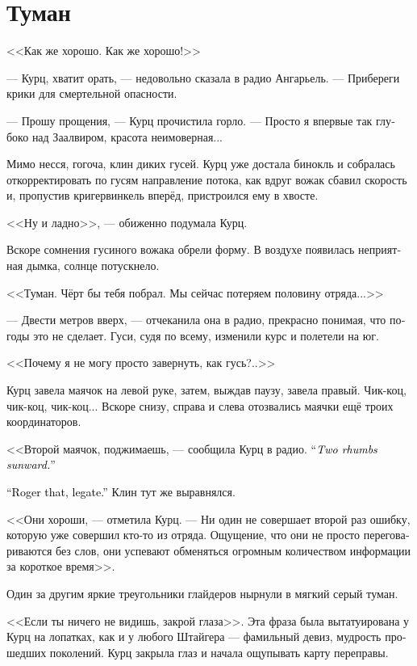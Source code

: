 \documentclass[a4paper,12pt,fleqn]{book}\usepackage{cooltooltips}\usepackage{polyglossia}\setdefaultlanguage[babelshorthands=true]{russian}\setotherlanguage{english}\defaultfontfeatures{Ligatures=TeX,Mapping=tex-text} \usepackage{xcolor}\definecolor{lightgray}{HTML}{bbbbbb}\color{lightgray}\newcommand{\ml}[3]{\textenglish{\textcolor{black}{#3}}}
\begin{document}
\section{Туман}

<<Как же хорошо.
Как же хорошо!>>

--- Курц, хватит орать, --- недовольно сказала в радио Ангарьель.
--- Прибереги крики для смертельной опасности.

--- Прошу прощения, --- Курц прочистила горло.
--- Просто я впервые так глубоко над Заалвиром, красота неимоверная...

Мимо несся, гогоча, клин диких гусей.
Курц уже достала бинокль и собралась откорректировать по гусям направление потока, как вдруг вожак сбавил скорость и, пропустив кригервинкель вперёд, пристроился ему в хвосте.

<<Ну и ладно>>, --- обиженно подумала Курц.

Вскоре сомнения гусиного вожака обрели форму.
В воздухе появилась неприятная дымка, солнце потускнело.

<<Туман.
Чёрт бы тебя побрал.
Мы сейчас потеряем половину отряда...>>

--- Двести метров вверх, --- отчеканила она в радио, прекрасно понимая, что погоды это не сделает.
Гуси, судя по всему, изменили курс и полетели на юг.

<<Почему я не могу просто завернуть, как гусь?..>>

Курц завела маячок на левой руке, затем, выждав паузу, завела правый.
Чик-коц, чик-коц, чик-коц...
Вскоре снизу, справа и слева отозвались маячки ещё троих координаторов.

<<Второй маячок, поджимаешь, --- сообщила Курц в радио.
\ml{$0$}
{--- Два румба посолонь>>.}
{``\textit{Two rhumbs sunward.}''}

\ml{$0$}
{<<Понял, легат>>.}
{``Roger that, legate.''}
Клин тут же выравнялся.

<<Они хороши, --- отметила Курц.
--- Ни один не совершает второй раз ошибку, которую уже совершил кто-то из отряда.
Ощущение, что они не просто переговариваются без слов, они успевают обменяться огромным количеством информации за короткое время>>.

Один за другим яркие треугольники глайдеров нырнули в мягкий серый туман.

<<Если ты ничего не видишь, закрой глаза>>.
Эта фраза была вытатуирована у Курц на лопатках, как и у любого Штайгера --- фамильный девиз, мудрость прошедших поколений.
Курц закрыла глаз и начала ощупывать карту переправы.
\end{document}
